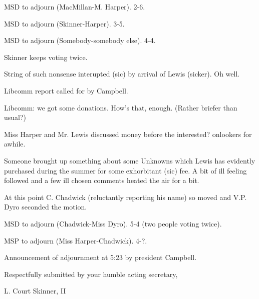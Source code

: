 \documentclass[12pt]{article}
\begin{document}
MSD to adjourn (MacMillan-M. Harper). 2-6.

MSD to adjourn (Skinner-Harper). 3-5.

MSD to adjourn (Somebody-somebody else). 4-4.

Skinner keeps voting twice.

String of such nonsense interupted (sic) by arrival of Lewis (sicker). Oh well.

Libcomm report called for by Campbell.

Libcomm: we got some donations. How's that, enough. (Rather briefer than usual?)

Miss Harper and Mr. Lewis discussed money before the interested? onlookers for awhile.

Someone brought up something about some Unknowns which Lewis has evidently purchased during the summer for some exhorbitant (sic) fee. A bit of ill feeling followed and a few ill chosen comments heated the air for a bit.

At this point C. Chadwick (reluctantly reporting his name) so moved and V.P. Dyro seconded the motion.

MSD to adjourn (Chadwick-Miss Dyro). 5-4 (two people voting twice).

MSP to adjourn (Miss Harper-Chadwick). 4-?.

Announcement of adjournment at 5:23 by president Campbell.

\vspace{12pt}

\centerline{Respectfully submitted by your humble acting secretary,}
\centerline{L. Court Skinner, II}
\end{document}
